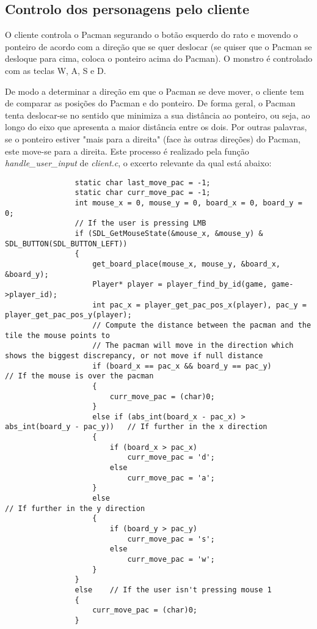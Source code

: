 \documentclass[a4paper]{report}
\begin{document}
        \subsection{Controlo dos personagens pelo cliente}
            \par O cliente controla o Pacman segurando o botão esquerdo do rato e movendo o ponteiro de acordo com a direção que se quer deslocar (se quiser que o Pacman se desloque para cima, coloca o ponteiro acima do Pacman). O monstro é controlado com as teclas W, A, S e D.
            \par De modo a determinar a direção em que o Pacman se deve mover, o cliente tem de comparar as posições do Pacman e do ponteiro. De forma geral, o Pacman tenta deslocar-se no sentido que minimiza a sua distância ao ponteiro, ou seja, ao longo do eixo que apresenta a maior distância entre os dois. Por outras palavras, se o ponteiro estiver "mais para a direita" (face às outras direções) do Pacman, este move-se para a direita. Este processo é realizado pela função \textit{handle\_user\_input} de \textit{client.c}, o excerto relevante da qual está abaixo:
            
            \begin{lstlisting}
                static char last_move_pac = -1;
                static char curr_move_pac = -1;
                int mouse_x = 0, mouse_y = 0, board_x = 0, board_y = 0;
                // If the user is pressing LMB
                if (SDL_GetMouseState(&mouse_x, &mouse_y) & SDL_BUTTON(SDL_BUTTON_LEFT))
                {
                    get_board_place(mouse_x, mouse_y, &board_x, &board_y);
                    Player* player = player_find_by_id(game, game->player_id);
                    int pac_x = player_get_pac_pos_x(player), pac_y = player_get_pac_pos_y(player);
                    // Compute the distance between the pacman and the tile the mouse points to
                    // The pacman will move in the direction which shows the biggest discrepancy, or not move if null distance
                    if (board_x == pac_x && board_y == pac_y)                       // If the mouse is over the pacman
                    {
                        curr_move_pac = (char)0;
                    }
                    else if (abs_int(board_x - pac_x) > abs_int(board_y - pac_y))   // If further in the x direction
                    {
                        if (board_x > pac_x)
                            curr_move_pac = 'd';
                        else
                            curr_move_pac = 'a';
                    }
                    else                                                            // If further in the y direction
                    {
                        if (board_y > pac_y)
                            curr_move_pac = 's';
                        else
                            curr_move_pac = 'w';
                    }
                }
                else    // If the user isn't pressing mouse 1
                {
                    curr_move_pac = (char)0;
                }
            \end{lstlisting}
            
\end{document}
